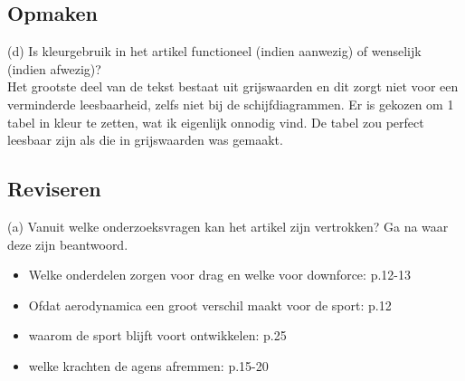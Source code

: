 \documentclass[a4paper,kulak]{kulakarticle} %
\begin{document}
\subsection{Opmaken}
(d) Is kleurgebruik in het artikel functioneel (indien aanwezig) of wenselijk (indien afwezig)?
\\

Het grootste deel van de tekst bestaat uit grijswaarden en dit zorgt niet voor een verminderde leesbaarheid, zelfs niet bij de schijfdiagrammen. Er is gekozen om 1 tabel in kleur te zetten, wat ik eigenlijk onnodig vind. De tabel zou perfect leesbaar zijn als die in grijswaarden was gemaakt.
\subsection{Reviseren}
(a) Vanuit welke onderzoeksvragen kan het artikel zijn vertrokken? Ga na waar deze zijn beantwoord.
\begin{itemize}
	\item Welke onderdelen zorgen voor drag en welke voor downforce: p.12-13
	\item Ofdat aerodynamica een groot verschil maakt voor de sport: p.12
	\item waarom de sport blijft voort ontwikkelen: p.25
	\item welke krachten de agens afremmen: p.15-20
\end{itemize}

\clearpage


\clearpage


\clearpage


\end{document}

